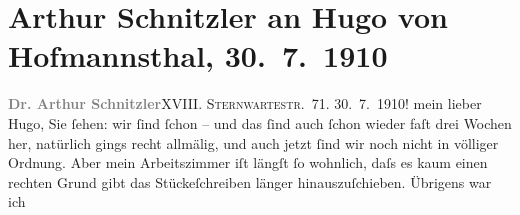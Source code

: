 

         
         \renewcommand{\erwaehntePersonen}{Personen: Otto Brahm, Rose Friedmann, Louis Philipp Friedmann, Hugo von Hofmannsthal, Gertrude von Hofmannsthal, Clara Jonas, Josef Kainz, Olga Schnitzler, Heinrich Schnitzler}
         \renewcommand{\erwaehnteOrte}{Orte: Aspang-Markt, Bad Ischl, Edmund-Weiß-Gasse, Glion, Kirchberg am Wechsel, Mönichkirchen, Otterthal, Rodaun, Semmering, Sonnwendstein, St. Gilgen, Sternwartestraße, Welsberg-Taisten, Wien, Österreich}
         \renewcommand{\erwaehnteWerke}{Werke: Der junge Medardus. Dramatische Historie in einem Vorspiel und fünf Aufzügen}
               \section[Arthur Schnitzler an Hugo von Hofmannsthal, 30. 7. 1910]{ Arthur Schnitzler an Hugo von Hofmannsthal, 30. 7. 1910}\nopagebreak{}\rehead{ }\begin{ledgroupsized}[t]{13cm}\normalsize\beginnumbering \toendnotes[C]{\smallbreak\pagebreak[2]} 
\toendnotes[C]{\smallbreak}\pstart
           \noindent{}{\pb}\textcolor{gray}{\textbf{Dr. Arthur Schnitzler}}\hfill XVIII. \textsc{Sternwartestr}. 71.\pend
           \pstart
           \textcolor{gray}{\textbf{}}\hfill 30. 7. 1910!\pend
           \pstart
           mein lieber Hugo, Sie ſehen: wir ſind ſchon \label{K_L01952_1v}\label{K_L01952_1h} – und das ſind auch ſchon wieder faſt drei Wochen her, natürlich gings recht
               allmälig, und auch jetzt ſind wir noch nicht in völliger Ordnung. Aber mein
               Arbeitszimmer iſt längſt ſo wohnlich, daſs es kaum einen rechten Grund gibt das
               Stückeſchreiben länger hinauszuſchieben. Übrigens war ich \label{K_L01952_2v}
\end{ledgroupsized}
